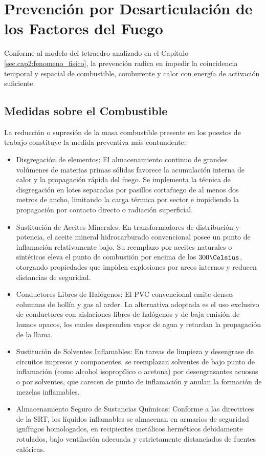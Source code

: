 \section{Prevención por Desarticulación de los Factores del Fuego}
\label{sec.cap7:factores_fuego}

Conforme al modelo del tetraedro analizado en el Capítulo \ref{sec.cap2:fenomeno_fisico}, la prevención radica en
impedir la coincidencia temporal y espacial de combustible, comburente y calor con energía de activación suficiente.

\subsection{Medidas sobre el Combustible}

La reducción o supresión de la masa combustible presente en los puestos de trabajo constituye la medida preventiva más
contundente:

\begin{itemize}
    \item Disgregación de elementos: El almacenamiento continuo de grandes volúmenes de materias primas sólidas
          favorece la acumulación interna de calor y la propagación rápida del fuego. Se implementa la técnica de
          disgregación en lotes separadas por pasillos cortafuego de al menos dos metros de ancho, limitando la
          carga térmica por sector e impidiendo la propagación por contacto directo o radiación superficial.
    \item Sustitución de Aceites Minerales: En transformadores de distribución y potencia, el aceite mineral
          hidrocarburado convencional posee un punto de inflamación relativamente bajo. Su reemplazo por aceites
          naturales o sintéticos eleva el punto de combustión por encima de los $300\Celsius$, otorgando propiedades
          que impiden explosiones por arcos internos y reducen distancias de seguridad.
    \item Conductores Libres de Halógenos: El PVC convencional emite densas columnas de hollín y gas al arder. La
          alternativa adoptada es el uso exclusivo de conductores con aislaciones libres de halógenos y de baja emisión
          de humos opacos, los cuales desprenden vapor de agua y retardan la propagación de la llama.
    \item Sustitución de Solventes Inflamables: En tareas de limpieza y desengrase de circuitos impresos y componentes, se
          reemplazan solventes de bajo punto de inflamación (como alcohol isopropílico o acetona) por desengrasantes
          acuosos o por solventes, que carecen de punto de inflamación y anulan la formación de mezclas inflamables.
    \item Almacenamiento Seguro de Sustancias Químicas: Conforme a las directrices de la SRT, los líquidos inflamables se
          almacenan en armarios de seguridad ignífugos homologados, en recipientes metálicos herméticos debidamente
          rotulados, bajo ventilación adecuada y estrictamente distanciados de fuentes calóricas.
\end{itemize}

